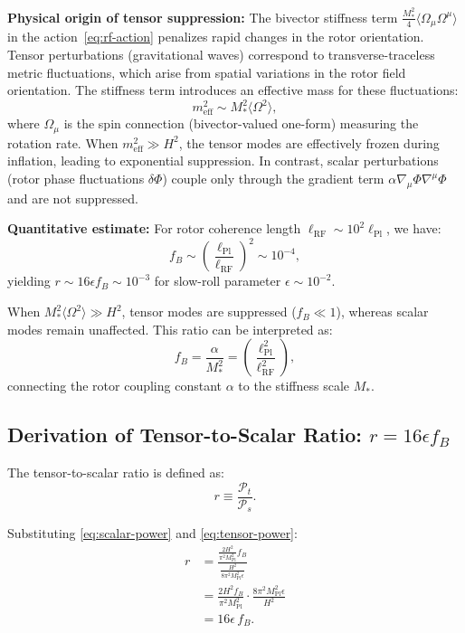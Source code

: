 \documentclass[11pt,a4paper]{article}
\numberwithin{equation}{section}
\theoremstyle{plain}
\theoremstyle{definition}
\theoremstyle{remark}
\begin{document}
\textbf{Physical origin of tensor suppression:} The bivector stiffness term $\frac{M_*^2}{4}\langle \Omega_\mu \Omega^\mu \rangle$ in the action~\eqref{eq:rf-action} penalizes rapid changes in the rotor orientation. Tensor perturbations (gravitational waves) correspond to transverse-traceless metric fluctuations, which arise from spatial variations in the rotor field orientation. The stiffness term introduces an effective mass for these fluctuations:
\begin{equation}
m_{\text{eff}}^2 \sim M_*^2 \langle \Omega^2 \rangle,
\end{equation}
where $\Omega_\mu$ is the spin connection (bivector-valued one-form) measuring the rotation rate. When $m_{\text{eff}}^2 \gg H^2$, the tensor modes are effectively frozen during inflation, leading to exponential suppression. In contrast, scalar perturbations (rotor phase fluctuations $\delta\Phi$) couple only through the gradient term $\alpha \nabla_\mu \Phi \nabla^\mu \Phi$ and are not suppressed.

\textbf{Quantitative estimate:} For rotor coherence length $\ell_{\text{RF}} \sim 10^2 \ell_{\text{Pl}}$, we have:
\begin{equation}
f_B \sim \left(\frac{\ell_{\text{Pl}}}{\ell_{\text{RF}}}\right)^2 \sim 10^{-4},
\end{equation}
yielding $r \sim 16\epsilon f_B \sim 10^{-3}$ for slow-roll parameter $\epsilon \sim 10^{-2}$.

When $M_*^2 \langle \Omega^2 \rangle \gg H^2$, tensor modes are suppressed ($f_B \ll 1$), whereas scalar modes remain unaffected. This ratio can be interpreted as:
\begin{equation}
f_B = \frac{\alpha}{M_*^2} = \left(\frac{\ell_{\text{Pl}}^2}{\ell_{\text{RF}}^2}\right),
\end{equation}
connecting the rotor coupling constant $\alpha$ to the stiffness scale $M_*$.

\subsection{Derivation of Tensor-to-Scalar Ratio: $r = 16\epsilon f_B$}

The tensor-to-scalar ratio is defined as:
\begin{equation}
r \equiv \frac{\mathcal{P}_t}{\mathcal{P}_s}.
\label{eq:r-def}
\end{equation}

Substituting \eqref{eq:scalar-power} and \eqref{eq:tensor-power}:
\begin{align}
r &= \frac{\frac{2H^2}{\pi^2 M_{\mathrm{Pl}}^2}f_B}{\frac{H^2}{8\pi^2 M_{\mathrm{Pl}}^2\epsilon}}\\
&= \frac{2H^2 f_B}{\pi^2 M_{\mathrm{Pl}}^2}\cdot\frac{8\pi^2 M_{\mathrm{Pl}}^2\epsilon}{H^2}\\
&= 16\epsilon\,f_B.
\label{eq:tensor-to-scalar}
\end{align}
\end{document}
